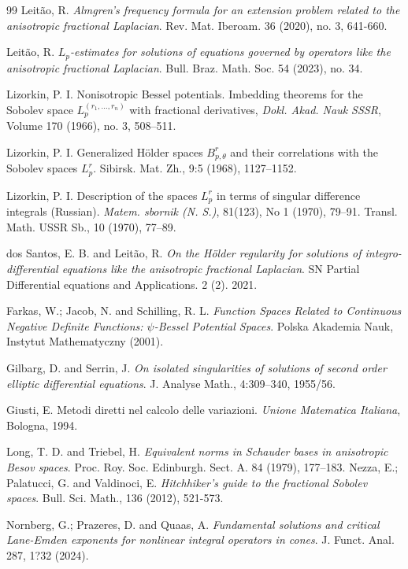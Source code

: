 \documentclass[10pt, leqno]{article}
\theoremstyle{definition}
\theoremstyle{remark}
\numberwithin{equation}{section}
\begin{document}
\begin{thebibliography}{99}
 Leit\~ao, R. \textit{Almgren's frequency formula for an extension problem related to the anisotropic fractional Laplacian}. Rev. Mat. Iberoam. 36 (2020), no. 3, 641-660.

 Leit\~ao, R. \textit{$L_{p}$-estimates for solutions of equations governed by operators like the anisotropic fractional Laplacian}. Bull. Braz. Math. Soc. 54 (2023), no. 34.

 Lizorkin, P. I. Nonisotropic Bessel potentials. Imbedding theorems for the Sobolev space $L_{p}^{(r_{1}, \dots, r_{n})}$ with fractional derivatives, \textit{Dokl. Akad. Nauk SSSR}, Volume 170 (1966), no. 3, 508--511.

 Lizorkin, P. I. Generalized H\" older spaces $B^{r}_{p,\theta}$ and their correlations with the Sobolev spaces $L^{r}_{p}$. Sibirsk. Mat. Zh., 9:5 (1968),  1127--1152.

 Lizorkin, P. I. Description of the spaces $L_{p}^{r}$ in terms of singular difference integrals (Russian). \textit{Matem. sbornik (N. S.)}, 81(123), No 1 (1970), 79--91. Transl. Math. USSR Sb., 10 (1970), 77--89.

 dos Santos, E. B. and Leit\~ao, R. \textit{On the H\" older regularity for solutions of integro-differential equations like the anisotropic fractional Laplacian}. SN Partial Differential equations and Applications. 2 (2). 2021.

 Farkas, W.; Jacob, N. and Schilling, R. L. \textit{Function Spaces Related to Continuous Negative Definite Functions: $\psi$-Bessel Potential Spaces}. Polska Akademia Nauk, Instytut Mathematyczny (2001).

 Gilbarg, D. and Serrin, J. \textit{On isolated singularities of solutions of second
 order elliptic differential equations}. J. Analyse Math., 4:309--340, 1955/56.

 Giusti, E. Metodi diretti nel calcolo delle variazioni. \textit{Unione Matematica Italiana}, Bologna, 1994.

 Long, T. D. and Triebel, H. \textit{Equivalent norms in Schauder bases in anisotropic Besov spaces}. Proc. Roy. Soc. Edinburgh. Sect. A. 84 (1979), 177--183.
 Nezza, E.; Palatucci, G. and Valdinoci, E. \textit{Hitchhiker's guide to the fractional Sobolev spaces}. Bull. Sci. Math., 136 (2012), 521-573.

 Nornberg, G.; Prazeres, D. and Quaas, A. \textit{Fundamental solutions and critical Lane-Emden exponents for nonlinear integral operators in cones}.  J. Funct. Anal. 287, 1?32 (2024).


\end{thebibliography}
\end{document}
